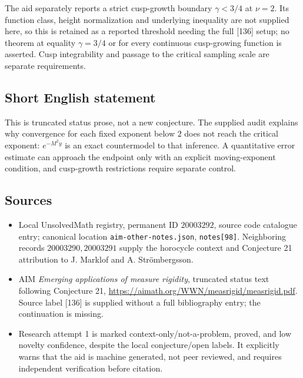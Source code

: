 \documentclass[11pt]{article}
\begin{document}
The aid separately reports a strict cusp-growth boundary $\gamma<3/4$ at $\nu=2$. Its function class, height normalization and underlying inequality are not supplied here, so this is retained as a reported threshold needing the full [136] setup; no theorem at equality $\gamma=3/4$ or for every continuous cusp-growing function is asserted. Cusp integrability and passage to the critical sampling scale are separate requirements.
\subsection{Short English statement}
This is truncated status prose, not a new conjecture. The supplied audit explains why convergence for each fixed exponent below $2$ does not reach the critical exponent: $e^{-M^2y}$ is an exact countermodel to that inference. A quantitative error estimate can approach the endpoint only with an explicit moving-exponent condition, and cusp-growth restrictions require separate control.
\subsection{Sources}
\begin{itemize}
\item Local UnsolvedMath registry, permanent ID $20003292$, source code catalogue entry; canonical location \texttt{aim-other-notes.json}, \texttt{notes[98]}. Neighboring records $20003290,20003291$ supply the horocycle context and Conjecture 21 attribution to J. Marklof and A. Str\"ombergsson.
\item AIM \emph{Emerging applications of measure rigidity}, truncated status text following Conjecture 21, \url{https://aimath.org/WWN/measrigid/measrigid.pdf}. Source label [136] is supplied without a full bibliography entry; the continuation is missing.
\item Research attempt 1 is marked context-only/not-a-problem, proved, and low novelty confidence, despite the local conjecture/open labels. It explicitly warns that the aid is machine generated, not peer reviewed, and requires independent verification before citation.
\end{itemize}
\end{document}
